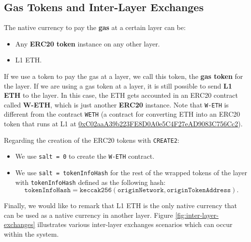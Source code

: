 %
%
%
%








\subsection{Gas Tokens and Inter-Layer Exchanges}

The native currency to pay the \textbf{gas} at a certain layer can be:

  \begin{itemize}

  \item Any \textbf{ERC20 token} instance on any other layer.
  \item L1 ETH.

  \end{itemize}

If we use a token to pay the gas at a layer, we call this token, the \textbf{gas token} for the layer. If we are using a gas token at a layer, it is still possible to send \textbf{L1 ETH} to the layer. In this case, the ETH gets accounted in an ERC20 contract called \textbf{W-ETH}, which is just another \textbf{ERC20} instance. Note that \texttt{W-ETH} is different from the contract \texttt{WETH} (a contract for converting ETH into an ERC20 token that runs at L1 at \href{https://etherscan.io/token/0xc02aaa39b223fe8d0a0e5c4f27ead9083c756cc2\#code}{0xC02aaA39b223FE8D0A0e5C4F27eAD9083C756Cc2}).

Regarding the creation of the ERC20 tokens with \texttt{CREATE2}:

\begin{itemize}
\item We use \texttt{salt = 0} to create the \texttt{W-ETH} contract.
\item We use \texttt{salt = tokenInfoHash} for the rest of the wrapped tokens of the layer with \texttt{tokenInfoHash} defined as the following hash:
\[
\texttt{tokenInfoHash} = \texttt{keccak256}(\texttt{originNetwork}, \texttt{originTokenAddress}).
\]
\end{itemize}
Finally, we would like to remark that L1 ETH is the only native currency that can be used as a native currency in another layer. Figure \ref{fig:inter-layer-exchanges} illustrates various inter-layer exchanges scenarios which can occur within the system.

